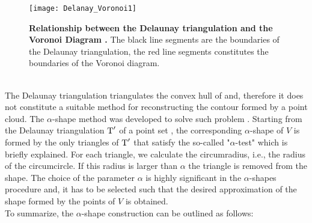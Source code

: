 \begin{figure}[t]
\centering
\texttt{[image: Delanay\_Voronoi1]}
\caption{\textbf{Relationship between the Delaunay triangulation and the Voronoi Diagram \cite{Wiki4}.} The black line segments are the boundaries of the Delaunay triangulation, the red line segments constitutes the boundaries of the Voronoi diagram.}
\label{fig:Voronoi}
\end{figure}
\\ \indent The Delaunay triangulation triangulates the convex hull of  and, therefore it does not constitute a suitable method for reconstructing the contour formed by a point cloud. The $\alpha$-shape method was developed to solve such problem \cite{edelsbrunner2010alpha, guo1997surface}. Starting from the Delaunay triangulation $\mbox{$\textup{T}$}^\prime$ of a point set , the corresponding $\alpha$-shape of $V$ is formed by the only triangles of $\mbox{$\textup{T}$}^\prime$ that satisfy the so-called "$\alpha$-test" which is briefly explained.
For each triangle, we calculate the circumradius, i.e., the radius of the circumcircle. If this radius is larger than $\alpha$ the triangle is removed from the shape. The choice of the parameter $\alpha$ is highly significant in the $\alpha$-shapes procedure and, it has to be selected such that the desired approximation of the shape formed by the points of $V$ is obtained.\\ \indent
To summarize, the $\alpha$-shape construction can be outlined as follows:
